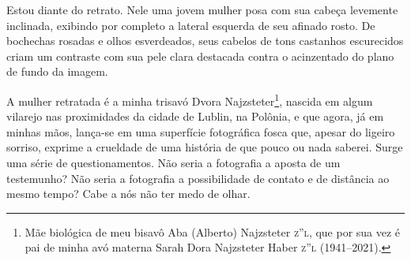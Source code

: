 
\noindent{}Estou diante do retrato. Nele uma jovem mulher posa com sua cabeça
levemente inclinada, exibindo por completo a lateral esquerda de seu
afinado rosto. De bochechas rosadas e olhos esverdeados, seus cabelos de
tons castanhos escurecidos criam um contraste com sua pele clara
destacada contra o acinzentado do plano de fundo da imagem.

A mulher retratada é a minha trisavó Dvora Najzsteter\footnote{Mãe
  biológica de meu bisavô Aba (Alberto) Najzsteter \textsc{z''l}, que por
  sua vez é pai de minha avó materna Sarah Dora Najzsteter Haber
  \textsc{z''l} (1941--2021).}, nascida em algum vilarejo nas proximidades
da cidade de Lublin, na Polônia, e que agora, já em minhas mãos,
lança-se em uma superfície fotográfica fosca que, apesar do ligeiro
sorriso, exprime a crueldade de uma história de que pouco ou nada
saberei. Surge uma série de questionamentos. Não seria a fotografia a
aposta de um testemunho? Não seria a fotografia a possibilidade de
contato e de distância ao mesmo tempo? Cabe a nós não ter medo de olhar.

